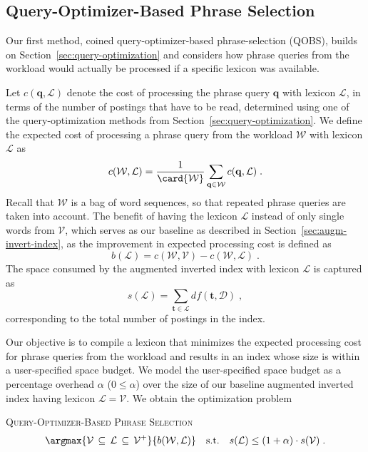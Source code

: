 \subsection{Query-Optimizer-Based Phrase Selection}
\label{subsec:qobs}

Our first method, coined query-optimizer-based phrase-selection
(QOBS), builds on Section~\ref{sec:query-optimization} and considers
how phrase queries from the workload would actually be processed if a
specific lexicon was available.

Let $c(\mathbf{q}, \mathcal{L})$ denote the cost of processing the
phrase query $\mathbf{q}$ with lexicon $\mathcal{L}$, in terms of
the number of postings that have to be read, determined using one of
the query-optimization methods from
Section~\ref{sec:query-optimization}. We define the expected cost of
processing a phrase query from the workload $\mathcal{W}$ with
lexicon $\mathcal{L}$ as
$$
  c(\mathcal{W}, \mathcal{L}) = \frac{1}{\card{\mathcal{W}}} \sum_{\mathbf{q} \in \mathcal{W}} c(\mathbf{q}, \mathcal{L})\;.
$$
Recall that $\mathcal{W}$ is a bag of word sequences, so that repeated
phrase queries are taken into account. The benefit of having the
lexicon $\mathcal{L}$ instead of only single words from
$\mathcal{V}$, which serves as our baseline as described in
Section~\ref{sec:augm-invert-index}, as the improvement in expected
processing cost is defined as
$$
 b(\mathcal{L}) = c(\mathcal{W}, \mathcal{V}) - c(\mathcal{W}, \mathcal{L})\;.
$$
The space consumed by the augmented inverted index with lexicon
$\mathcal{L}$ is captured as
$$
s(\mathcal{L}) = \sum_{\mathbf{t} \in \mathcal{L}} df(\mathbf{t},\mathcal{D})\;,
$$
corresponding to the total number of postings in the index.

Our objective is to compile a lexicon that minimizes the expected
processing cost for phrase queries from the workload and results in an
index whose size is within a user-specified space budget. We model the
user-specified space budget as a percentage overhead $\alpha$
($0 \le \alpha$) over the size of our baseline augmented inverted
index having lexicon $\mathcal{L} = \mathcal{V}$. We obtain the
optimization problem
\begin{definition}{\textsc{Query-Optimizer-Based Phrase Selection}}
$$
\argmax{\mathcal{V} \,\subseteq\, \mathcal{L} \,\subseteq\, \mathcal{V^+}}{b(\mathcal{W}, \mathcal{L})} \quad\mbox{s.t.}\quad s(\mathcal{L}) \le (1 + \alpha) \cdot s(\mathcal{V}) \;.
$$
\end{definition}

